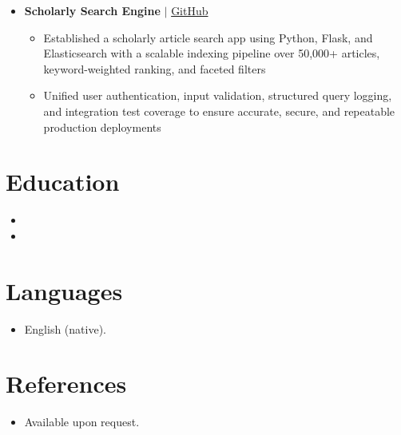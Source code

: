 \documentclass[11pt,a4paper,sans]{moderncv}
\begin{document}
\begin{itemize}
\item \textbf{Scholarly Search Engine} $\vert$ \href{https://github.com/sisodiajatin/CS547-IR-Scholarly-Search}{GitHub}
\begin{itemize}
    \item Established a scholarly article search app using Python, Flask, and Elasticsearch with a scalable indexing pipeline over 50,000+ articles, keyword-weighted ranking, and faceted filters
    \item Unified user authentication, input validation, structured query logging, and integration test coverage to ensure accurate, secure, and repeatable production deployments
\end{itemize}

\end{itemize}


\section{Education}
\vspace{1pt}
\begin{itemize}

\item{}

\vspace{3pt}

\item{}

\end{itemize}


\section{Languages}
\vspace{1pt}
\begin{itemize}
\item English (native).
\end{itemize}


\section{References}
\vspace{1pt}
\begin{itemize}
\item{Available upon request.}
\end{itemize}
\end{document}
